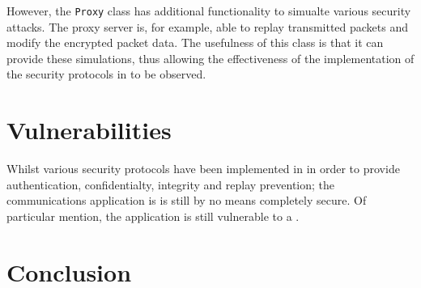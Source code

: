 \documentclass[a4paper,11pt]{article}
\begin{document}
However, the \verb+Proxy+ class has additional functionality to simualte 
various security attacks. The proxy server is, for example, able to replay 
transmitted packets and modify the encrypted packet data. The usefulness of this
class is that it can provide these simulations, thus allowing the effectiveness
of the implementation of the security protocols in \serviceName{} to be 
observed.

\section{Vulnerabilities}
Whilst various security protocols have been implemented in \serviceName{} in 
order to provide authentication, confidentialty, integrity and replay 
prevention; the communications application is is still by no means completely
secure. Of particular mention, the application is still vulnerable to a 
.


\section{Conclusion}
\end{document}
